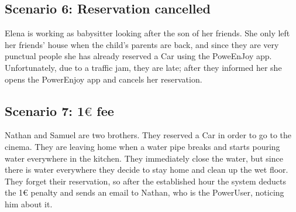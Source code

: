 \subsection{Scenario 6: Reservation cancelled}
Elena is working as babysitter looking after the son of her friends. She only left her friends' house when the child's parents are back, and since they are very punctual people she has already reserved a Car using the PoweEnJoy app. Unfortunately, due to a traffic jam, they are late; after they informed her she opens the PowerEnjoy app and cancels her reservation.

\subsection{Scenario 7: 1$\euro$ fee}
Nathan and Samuel are two brothers. They reserved a Car in order to go to the cinema. They are leaving home when a water pipe breaks and starts pouring water everywhere in the kitchen. They immediately close the water, but since there is water everywhere they decide to stay home and clean up the wet floor. They forget their reservation, so after the established hour the system deducts the 1$\euro$ penalty and sends an email to Nathan, who is the PowerUser, noticing him about it.